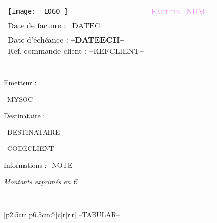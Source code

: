 \documentclass[a4paper, oneside, 10pt, french]{article}
\makeatletter
\newenvironment{strictsupertabular*} 
      {\let\estimate@lineht\mod@estimate@lineht\@nameuse{supertabular*}} 
      {\@nameuse{endsupertabular*}}
\makeatother
\begin{document}
\begin{tabular}{p{9cm} p{8cm}}
    \vspace{0pt} 
    \texttt{[image: --LOGO--]}
    & 
    \vspace{0pt}
   \raggedleft
	\textcolor{violet}{\textsc{\Large Facture --NUM--}}\\
	Date de facture : --DATEC--\\
	{\small Date d'échéance : \textbf{--DATEECH--}\\
	Ref. commande client : --REFCLIENT--\\}~\\
\end{tabular}

\vspace{-0.7cm}

\begin{minipage}[t]{0.40\textwidth}
{\small Emetteur :}\\
\begin{fminipage}
--MYSOC--
\end{fminipage}
\end{minipage}
\hspace{1cm}
\begin{minipage}[t]{0.52\textwidth}
{\small Destinataire :}

\begin{fminipage}
--DESTINATAIRE--\\
\begin{minipage}{\textwidth}
\flushright
{\tiny --CODECLIENT--}
\end{minipage}
\end{fminipage}
\end{minipage}

Informations : --NOTE--

\tablelasttail{\hline}
\begin{minipage}{\textwidth}
\flushright 
{\footnotesize \textit{Montants exprimés en €}}
\end{minipage}\\
\begin{strictsupertabular*}{\textwidth}{|p{2.5cm}|p{6.5cm}@{}|c|r|r|r|}
--TABULAR--
\end{strictsupertabular*}
\end{document}
